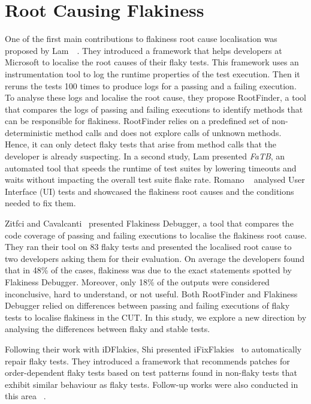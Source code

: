 
\section{Root Causing Flakiness}

One of the first main contributions to flakiness root cause localisation was proposed by Lam~\etal~\cite{Lam2019RootCausing}. 
They introduced a framework that helps developers at Microsoft to localise the root causes of their flaky tests. This framework uses an instrumentation tool to log the runtime properties of the test execution. Then it reruns the tests 100 times to produce logs for a passing and a failing execution. To analyse these logs and localise the root cause, they propose RootFinder, a tool that compares the logs of passing and failing executions to identify methods that can be responsible for flakiness. RootFinder relies on a predefined set of non-deterministic method calls and does not explore calls of unknown methods. Hence, it can only detect flaky tests that arise from method calls that the developer is already suspecting. In a second study, Lam \etal presented \textit{FaTB}, an automated tool that speeds the runtime of test suites by lowering timeouts and waits without impacting the overall test suite flake rate. 
Romano \etal~\cite{romano2021empirical} analysed User Interface (UI) tests and showcased the flakiness root causes and the conditions needed to fix them.

Zitfci and Cavalcanti~\cite{ziftci2020flake} presented Flakiness Debugger, a tool that compares the code coverage of passing and failing executions to localise the flakiness root cause. They ran their tool on 83 flaky tests and presented the localised root cause to two developers asking them for their evaluation. On average the developers found that in 48\% of the cases, flakiness was due to the exact statements spotted by Flakiness Debugger. Moreover, only 18\% of the outputs were considered inconclusive, hard to understand, or not useful.
Both RootFinder and Flakiness Debugger relied on differences between passing and failing executions of flaky tests to localise flakiness in the CUT. In this study, we explore a new direction by analysing the differences between flaky and stable tests.

Following their work with iDFlakies, Shi \etal presented iFixFlakies~\cite{Shi2019iFix} to automatically repair flaky tests. They introduced a framework that recommends patches for order-dependent flaky tests based on test patterns found in non-flaky tests that exhibit similar behaviour as flaky tests. Follow-up works were also conducted in this area ~\cite{li2022repairing}.
  
